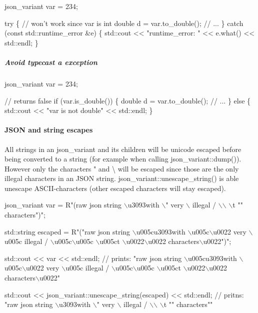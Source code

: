 \begin{DoxyCode}
json\_variant var = 234;

try \{
    // won't work since var is int
    double d = var.to\_double();  
    // ...
\}
catch (const std::runtime\_error &e) \{
    std::cout << "runtime\_error: " << e.what() << std::endl;   
\} 
\end{DoxyCode}


\subparagraph*{\label{_avoid_typecast_exception_section}%
Avoid typecast a exception}


\begin{DoxyCode}
json\_variant var = 234;

// returns false
if (var.is\_double()) \{
    double d = var.to\_double();   
    // ...
\}
else \{
    std::cout << "var is not double" << std::endl;   
\}
\end{DoxyCode}


\paragraph*{\label{_json_and_string_escapes_section}%
J\+S\+ON and string escapes}

All strings in an {\ttfamily json\+\_\+variant} and its children will be unicode escaped before being converted to a string (for example when calling {\ttfamily json\+\_\+variant\+::dump()}). However only the characters " and \textbackslash{} will be escaped since those are the only illegal characters in an J\+S\+ON string. json\+\_\+variant\+::unescape\+\_\+string() is able unescape A\+S\+C\+I\+I-\/characters (other escaped characters will stay escaped).


\begin{DoxyCode}
json\_variant var = R"(raw json string \(\backslash\)u3093with \(\backslash\)" very \(\backslash\) illegal / \(\backslash\)\(\backslash\) \(\backslash\)t "" characters")";

std::string escaped = R"("raw json string \(\backslash\)u005cu3093with \(\backslash\)u005c\(\backslash\)u0022 very \(\backslash\)u005c illegal / \(\backslash\)u005c\(\backslash\)u005c
       \(\backslash\)u005ct \(\backslash\)u0022\(\backslash\)u0022 characters\(\backslash\)u0022")";

std::cout << var << std::endl;
// prints: "raw json string \(\backslash\)u005cu3093with \(\backslash\)u005c\(\backslash\)u0022 very \(\backslash\)u005c illegal / \(\backslash\)u005c\(\backslash\)u005c \(\backslash\)u005ct
       \(\backslash\)u0022\(\backslash\)u0022 characters\(\backslash\)u0022"

std::cout << json\_variant::unescape\_string(escaped) << std::endl;
// pritns: "raw json string \(\backslash\)u3093with \(\backslash\)" very \(\backslash\) illegal / \(\backslash\)\(\backslash\) \(\backslash\)t "" characters""
\end{DoxyCode}


